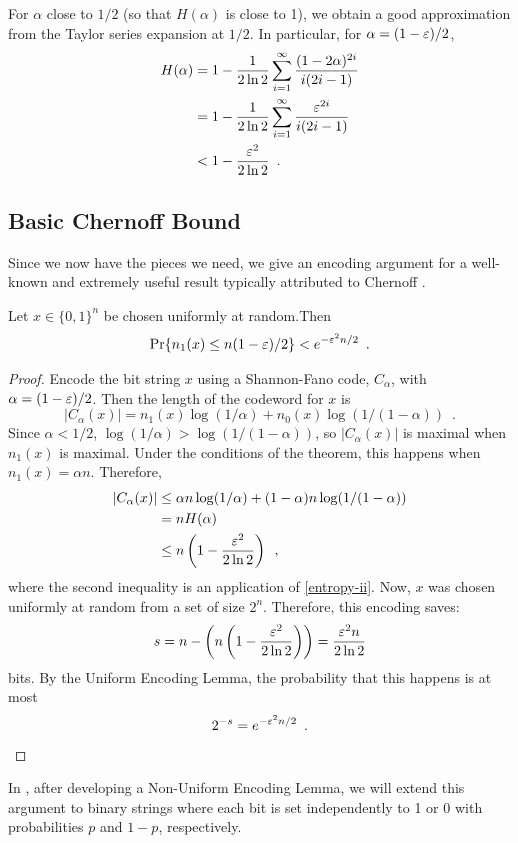 \documentclass{patmorin}
\begin{document}
For $\alpha$ close to $1/2$ (so that $H(\alpha)$ is close to 1), we
obtain a good approximation from the Taylor series expansion at
$1/2$. In particular, for $\alpha=(1-\varepsilon)/2$,
\begin{align}
  H(\alpha) & = 1-\frac{1}{2\ln 2}\sum_{i=1}^{\infty}\frac{(1-2\alpha)^{2i}}{i(2i-1)} 
              \notag \\ 
            & = 1-\frac{1}{2\ln 2}\sum_{i=1}^{\infty}\frac{\eps^{2i}}{i(2i-1)} 
              \notag \\ 
            & < 1-\frac{\eps^2}{2\ln 2} \enspace .\eqlabel{entropy-ii}
\end{align}

\subsection{Basic Chernoff Bound}

Since we now have the pieces we need, we give an encoding argument for
a well-known and extremely useful result typically attributed to
Chernoff \cite{chernoff:bound}.

\begin{thm}
  Let $x\in\{0,1\}^n$ be chosen uniformly at random.Then
  \[
    \Pr\{n_1(x) \le n(1-\varepsilon)/2\} < e^{-\varepsilon^2n/2} \enspace .
  \]
\end{thm}

\begin{proof}
  Encode the bit string $x$ using a Shannon-Fano code, $C_\alpha$,
  with $\alpha=(1-\varepsilon)/2$.  Then the length of the codeword for $x$
  is
  \[
    |C_\alpha(x)| = n_1(x)\log(1/\alpha) + n_0(x)\log (1/(1-\alpha))
    \enspace .
  \]
  Since $\alpha < 1/2$, $\log(1/\alpha) > \log(1/(1-\alpha))$, so
  $|C_\alpha(x)|$ is maximal when $n_1(x)$ is maximal.  Under the
  conditions of the theorem, this happens when $n_1(x)=\alpha n$.
  Therefore,
  \begin{align*}
    |C_\alpha(x)| & \le \alpha n\log(1/\alpha) + (1-\alpha)n\log(1/(1-\alpha))\\
                  & = n H(\alpha) \\
                  & \le n\left(1-\frac{\varepsilon^2}{2\ln 2}\right) \enspace ,
  \end{align*}
  where the second inequality is an application of \eqref{entropy-ii}.
  Now, $x$ was chosen uniformly at random from a set of size $2^n$.
  Therefore, this encoding saves:
  \[  
    s = n-\left(n\left(1-\frac{\varepsilon^2}{2\ln 2}\right)\right) =
    \frac{\varepsilon^2n}{2\ln 2}
  \]
  bits.  By the Uniform Encoding Lemma, the probability that this
  happens is at most
  \[
    2^{-s} = e^{-\varepsilon^2n/2} \enspace . \qedhere
  \]
\end{proof}
In , after developing a Non-Uniform Encoding Lemma,
we will extend this argument to binary strings where each bit is set
independently to 1 or 0 with probabilities $p$ and $1-p$,
respectively.
\end{document}
